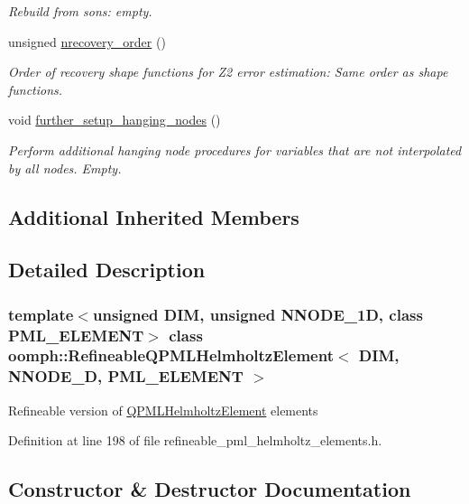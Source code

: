 \begin{DoxyCompactItemize}
\begin{DoxyCompactList}\small\item\em Rebuild from sons\+: empty. \end{DoxyCompactList}\item 
unsigned \hyperlink{classoomph_1_1RefineableQPMLHelmholtzElement_ab60d67d814159aa25c5b0f980786d3f6}{nrecovery\+\_\+order} ()
\begin{DoxyCompactList}\small\item\em Order of recovery shape functions for Z2 error estimation\+: Same order as shape functions. \end{DoxyCompactList}\item 
void \hyperlink{classoomph_1_1RefineableQPMLHelmholtzElement_ac512e133c8fde649cd6aa437ae85b008}{further\+\_\+setup\+\_\+hanging\+\_\+nodes} ()
\begin{DoxyCompactList}\small\item\em Perform additional hanging node procedures for variables that are not interpolated by all nodes. Empty. \end{DoxyCompactList}\end{DoxyCompactItemize}
\subsection*{Additional Inherited Members}


\subsection{Detailed Description}
\subsubsection*{template$<$unsigned D\+IM, unsigned N\+N\+O\+D\+E\+\_\+1D, class P\+M\+L\+\_\+\+E\+L\+E\+M\+E\+NT$>$\newline
class oomph\+::\+Refineable\+Q\+P\+M\+L\+Helmholtz\+Element$<$ D\+I\+M, N\+N\+O\+D\+E\+\_\+D, P\+M\+L\+\_\+\+E\+L\+E\+M\+E\+N\+T $>$}

Refineable version of \hyperlink{classoomph_1_1QPMLHelmholtzElement}{Q\+P\+M\+L\+Helmholtz\+Element} elements 

Definition at line 198 of file refineable\+\_\+pml\+\_\+helmholtz\+\_\+elements.\+h.



\subsection{Constructor \& Destructor Documentation}
\mbox{\label{classoomph_1_1RefineableQPMLHelmholtzElement_a1874e16af4b8c3cf044268810e886fa8}} 
